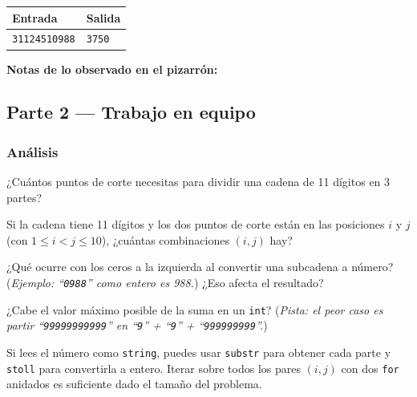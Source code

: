 \documentclass[12pt, oneside]{article}
\begin{document}
\begin{center}
\begin{tabular}{ll}
  \toprule
  \textbf{Entrada} & \textbf{Salida} \\
  \midrule
  \texttt{31124510988} & \texttt{3750} \\
  \bottomrule
\end{tabular}
\end{center}

\textbf{Notas de lo observado en el pizarrón:}

\vspace{3.5cm}

\subsection{Parte 2 — Trabajo en equipo}

\subsubsection{Análisis}

¿Cuántos puntos de corte necesitas para dividir una cadena de 11
dígitos en 3 partes?

\vspace{1.5cm}

Si la cadena tiene 11 dígitos y los dos puntos de corte están en las
posiciones $i$ y $j$ (con $1 \le i < j \le 10$), ¿cuántas combinaciones
$(i, j)$ hay?

\vspace{1.5cm}

¿Qué ocurre con los ceros a la izquierda al convertir una subcadena a
número?  (\textit{Ejemplo: ``\texttt{0988}'' como entero es 988.})
¿Eso afecta el resultado?

\vspace{2cm}

¿Cabe el valor máximo posible de la suma en un \texttt{int}?
(\textit{Pista: el peor caso es partir ``\texttt{99999999999}''
en ``\texttt{9}'' + ``\texttt{9}'' + ``\texttt{999999999}''.})

\vspace{2cm}

\begin{recuerda}
  Si lees el número como \texttt{string}, puedes usar \texttt{substr}
  para obtener cada parte y \texttt{stoll} para convertirla a entero.
  Iterar sobre todos los pares $(i, j)$ con dos \texttt{for} anidados
  es suficiente dado el tamaño del problema.
\end{recuerda}
\end{document}
